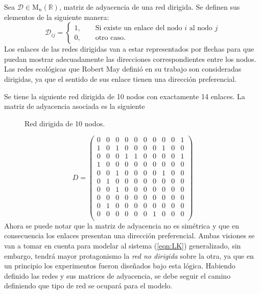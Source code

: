 \begin{definición}
	Sea $\mathcal{D}\in\mathrm{M}_n(\mathbb{R})$, matriz de adyacencia de una red dirigida. Se definen sus elementos de la siguiente manera:
	$$
	\mathcal{D}_{ij}=\begin{cases}
		1,\qquad\text{Si existe un enlace del nodo $i$ al nodo $j$}\\
		0,\qquad\text{otro caso.}
	\end{cases}
	$$
	Los enlaces de las redes dirigidas van a estar representados por flechas para que puedan mostrar adecuadamente las direcciones correspondientes entre los nodos. Las redes ecológicas que Robert May definió en su trabajo son consideradas dirigidas, ya que el sentido de sus enlace tienen una dirección preferencial.
\end{definición}

\begin{ejemplo}
	Se tiene la siguiente red dirigida de 10 nodos con exactamente 14 enlaces. La matriz de adyacencia asociada es la siguiente
\end{ejemplo}
\begin{figure} \vspace{-44pt} \begin{center}
		 
	\end{center} 
	\vspace{-20pt} 
	\caption{Red dirigida de 10 nodos.} 
	\vspace{-200pt}
	\label{fig:Red10Dir}
\end{figure} 
$$
D = \begin{pmatrix}
	0 & 0 & 0 & 0 & 0 & 0 & 0 & 0 & 0 & 1 \\
	1 & 0 & 1 & 0 & 0 & 0 & 0 & 1 & 0 & 0 \\
	0 & 0 & 0 & 1 & 1 & 0 & 0 & 0 & 0 & 1 \\
	1 & 0 & 0 & 0 & 0 & 0 & 0 & 0 & 0 & 0 \\
	0 & 0 & 1 & 0 & 0 & 0 & 0 & 1 & 0 & 0 \\
	0 & 1 & 0 & 0 & 0 & 0 & 0 & 0 & 0 & 0 \\
	0 & 0 & 1 & 0 & 0 & 0 & 0 & 0 & 0 & 0 \\
	0 & 0 & 0 & 0 & 0 & 0 & 0 & 0 & 0 & 0 \\
	0 & 1 & 0 & 0 & 0 & 0 & 0 & 0 & 0 & 0 \\
	0 & 0 & 0 & 0 & 0 & 0 & 1 & 0 & 0 & 0 \\
\end{pmatrix}
$$
\newpage
Ahora se puede notar que la matriz de adyacencia no es simétrica y que en consecuencia los enlaces presentan una dirección preferencial. Ambas visiones se van a tomar en cuenta para modelar al sistema (\ref{eqn:LK}) generalizado, sin embargo, tendrá mayor protagonismo la \textit{red no dirigida} sobre la otra, ya que en un principio los experimentos fueron diseñados bajo esta lógica. Habiendo definido las redes y sus matrices de adyacencia, se debe seguir el camino definiendo que tipo de red se ocupará para el modelo.

